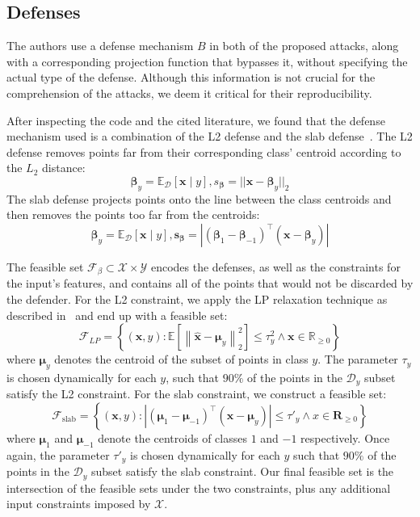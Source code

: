 \subsection{Defenses}
\label{sec:Defenses}
The authors use a defense mechanism $B$ in both of the proposed attacks, along with a corresponding projection function that bypasses it, without specifying the actual type of the defense. Although this information is not crucial for the comprehension of the attacks, we deem it critical for their reproducibility.

After inspecting the code and the cited literature, we found that the defense mechanism used is a combination of the L2 defense and the slab defense~\cite{steinhardt2017defenses}. The L2 defense removes points far from their corresponding class' centroid according to the $L_2$ distance:
$$\boldsymbol{\beta}_{y}=\mathbb{E}_{\mathcal{D}}[\mathbf{x}\mid y], s_{\boldsymbol{\beta}}=||\mathbf{x}-\boldsymbol{\beta}_{y}||_2$$
The slab defense projects points onto the line between the class centroids and then removes the points too far from the centroids:
$$\boldsymbol{\beta}_{y}=\mathbb{E}_{\mathcal{D}}[\mathbf{x}\mid y], \mathbf{s}_{\boldsymbol{\beta}}=\left|(\boldsymbol{\beta}_{1}-\boldsymbol{\beta}_{-1})^\top (\mathbf{x}-\boldsymbol{\beta}_y)\right|$$

The feasible set $\mathcal{F}_\beta\subset\mathcal{X}\times\mathcal{Y}$ encodes the defenses, as well as the constraints for the input's features, and contains all of the points that would not be discarded by the defender. For the L2 constraint, we apply the LP relaxation technique as described in~\cite{koh2018} and end up with a feasible set:
$$\mathcal{F}_{L P}=\left\{(\mathbf{x}, y): \mathbb{E}\left[\left\|\hat{\mathbf{x}}-\boldsymbol{\mu}_{y}\right\|_{2}^{2}\right] \leq \tau_{y}^{2} \land \mathbf{x} \in \mathbb{R}_{\geq 0}\right\}$$
where $\boldsymbol{\mu}_{y}$ denotes the centroid of the subset of points in class $y$. The parameter $\tau_{y}$ is chosen dynamically for each $y$, such that $90\%$ of the points in the $\mathcal{D}_{y}$ subset satisfy the L2 constraint. For the slab constraint, we construct a feasible set:
$$\mathcal{F}_{\mathrm{slab}}=\left\{(\mathbf{x},y): |(\boldsymbol{\mu}_{1}-\boldsymbol{\mu}_{-1})^\top (\mathbf{x}-\boldsymbol{\mu}_{y})| \leq \tau'_y \land x\in\mathbf{R}_{\geq 0}\right\}$$
where $\boldsymbol{\mu}_1$ and $\boldsymbol{\mu}_{-1}$ denote the centroids of classes $1$ and $-1$ respectively. Once again, the parameter $\tau'_y$ is chosen dynamically for each $y$ such that $90\%$ of the points in the $\mathcal{D}_y$ subset satisfy the slab constraint. Our final feasible set is the intersection of the feasible sets under the two constraints, plus any additional input constraints imposed by $\mathcal{X}$.

